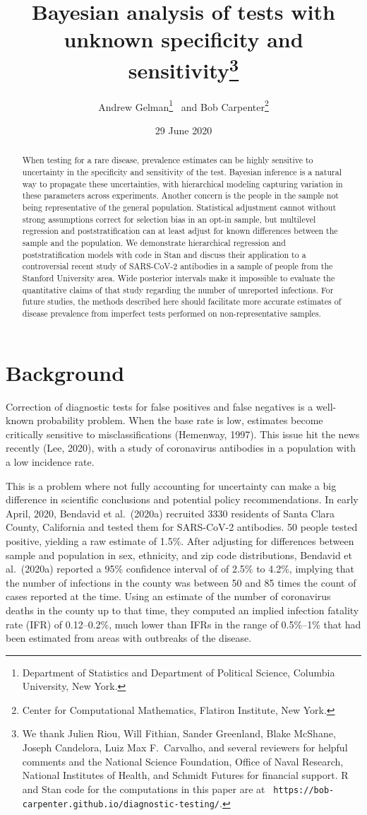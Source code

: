 \documentclass[11pt]{article}
\title{\bf Bayesian analysis of tests with unknown specificity and
  sensitivity\footnote{We thank Julien Riou, Will Fithian, Sander
    Greenland, Blake McShane, Joseph Candelora, Luiz Max F.~Carvalho,
    and several reviewers for helpful comments and the National
    Science Foundation, Office of Naval Research, National Institutes
    of Health, and Schmidt Futures for financial support.  R and Stan
    code for the computations in this paper are at {\tt
      https://bob-carpenter.github.io/diagnostic-testing/}.}\vspace{.1in}}
\author{Andrew Gelman\footnote{Department of Statistics and Department
    of Political Science, Columbia University, New York.}  \ and Bob
  Carpenter\footnote{Center for Computational Mathematics, Flatiron
    Institute, New York.}  \vspace{.1in}}
\date{29 June 2020}
\begin{document}
\sloppy
\maketitle

\begin{abstract}
\noindent
When testing for a rare disease, prevalence estimates can be highly
sensitive to uncertainty in the specificity and sensitivity of the
test.  Bayesian inference is a natural way to propagate these
uncertainties, with hierarchical modeling capturing variation in these
parameters across experiments.  Another concern is the people in the
sample not being representative of the general population.
Statistical adjustment cannot without strong assumptions correct for
selection bias in an opt-in sample, but multilevel regression and
poststratification can at least adjust for known differences between
the sample and the population.  We demonstrate hierarchical regression
and poststratification models with code in Stan and discuss their
application to a controversial recent study of SARS-CoV-2 antibodies in
a sample of people from the Stanford University area.  Wide posterior
intervals make it impossible to evaluate the quantitative claims of
that study regarding the number of unreported infections.  For future
studies, the methods described here should facilitate more accurate
estimates of disease prevalence from imperfect tests performed on
non-representative samples.
\end{abstract}

\section{Background}

Correction of diagnostic tests for false positives and false negatives
is a well-known probability problem.  When the base rate is low,
estimates become critically sensitive to misclassifications (Hemenway,
1997).  This issue hit the news recently (Lee, 2020), with a
study of coronavirus antibodies in a population with a low incidence
rate.

This is a problem where not fully accounting for uncertainty can make
a big difference in scientific conclusions and potential policy
recommendations.  In early April, 2020, Bendavid et al.\ (2020a)
recruited 3330 residents of Santa Clara County, California and tested
them for SARS-CoV-2 antibodies.  50 people tested positive, yielding a
raw estimate of 1.5\%.  After adjusting for differences between sample
and population in sex, ethnicity, and zip code distributions, Bendavid
et al.\ (2020a) reported a 95\% confidence interval of of 2.5\% to 4.2\%,
implying that the number of infections in the county was between 50
and 85 times the count of cases reported at the time.  Using an
estimate of the number of coronavirus deaths in the county up to that
time, they computed an implied infection fatality rate (IFR) of
0.12--0.2\%, much lower than IFRs in the range of 0.5\%--1\% that had
been estimated from areas with outbreaks of the disease.
\end{document}
